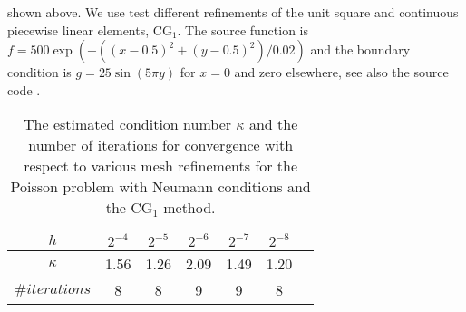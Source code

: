 shown above. We use test different refinements of the unit square and 
continuous piecewise linear elements, $\mathrm{CG}_1$. The source function is $f= 500\exp(-((x-0.5)^2 + (y-0.5)^2)/0.02)$ and
the boundary condition is $g =  25 \sin(5\pi y)$ for $x=0$ and zero elsewhere, see also the source code . 
\begin{table}
\begin{center}
\begin{tabular}{|c||c|c|c|c|c|c|}
\hline
$h$ & $2^{-4}$ & $2^{-5}$ & $2^{-6}$ & $2^{-7}$ & $2^{-8}$ \\ \hline 
$\kappa$ & 1.56 & 1.26 & 2.09 & 1.49 & 1.20 \\ \hline
$\#iterations$ & 8 & 8 & 9 & 9 & 8 \\ \hline 
\end{tabular}
\caption{The estimated condition number $\kappa$ and the number of iterations for 
  convergence with respect to various mesh refinements for the Poisson 
  problem with Neumann conditions and
  the $\mathrm{CG}_1$ method.}\label{tabel:neumann} 
\end{center}
\end{table}



